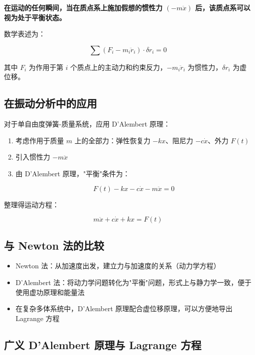 \textbf{在运动的任何瞬间，当在质点系上施加假想的惯性力 $(-m\ddot{x})$ 后，该质点系可以视为处于平衡状态。}

数学表述为：
\begin{myformula}
    \[
    \sum(F_i - m_i\ddot{r}_i)\cdot\delta r_i = 0
    \]
\end{myformula}
其中 $F_i$ 为作用于第 $i$ 个质点上的主动力和约束反力，$-m_i\ddot{r}_i$ 为惯性力，$\delta r_i$ 为虚位移。

\subsection{在振动分析中的应用}

对于单自由度弹簧-质量系统，应用 D'Alembert 原理：

\begin{enumerate}
    \item 考虑作用于质量 $m$ 上的全部力：弹性恢复力 $-kx$、阻尼力 $-c\dot{x}$、外力 $F(t)$
    \item 引入惯性力 $-m\ddot{x}$
    \item 由 D'Alembert 原理，"平衡"条件为：
    \begin{myformula}
        \[
        F(t) - kx - c\dot{x} - m\ddot{x} = 0
        \]
    \end{myformula}
\end{enumerate}

整理得运动方程：
\begin{myformula}
    \[
    m\ddot{x} + c\dot{x} + kx = F(t)
    \]
\end{myformula}

\subsection{与 Newton 法的比较}

\begin{itemize}
    \item Newton 法：从加速度出发，建立力与加速度的关系（动力学方程）
    \item D'Alembert 法：将动力学问题转化为"平衡"问题，形式上与静力学一致，便于使用虚功原理和能量法
    \item 在复杂多体系统中，D'Alembert 原理配合虚位移原理，可以方便地导出 Lagrange 方程
\end{itemize}

\subsection{广义 D'Alembert 原理与 Lagrange 方程}

